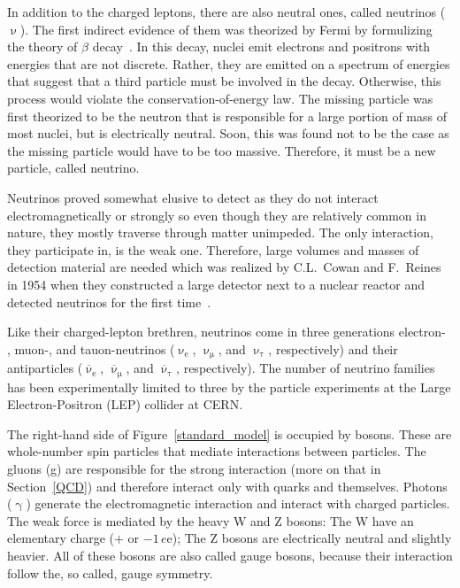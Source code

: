In addition to the charged leptons, there are also neutral ones, called neutrinos ($\upnu$)\@. The first indirect evidence of them was theorized by Fermi by formulizing the theory of $\beta$ decay~\cite{Fermi}\@. In this decay, nuclei emit electrons and positrons with energies that are not discrete. Rather, they are emitted on a spectrum of energies that suggest that a third particle must be involved in the decay. Otherwise, this process would violate the conservation-of-energy law. The missing particle was first theorized to be the neutron that is responsible for a large portion of mass of most nuclei, but is electrically neutral. Soon, this was found not to be the case as the missing particle would have to be too massive. Therefore, it must be a new particle, called neutrino.

Neutrinos proved somewhat elusive to detect as they do not interact electromagnetically or strongly so even though they are relatively common in nature, they mostly traverse through matter unimpeded. The only interaction, they participate in, is the weak one. Therefore, large volumes and masses of detection material are needed which was realized by C.L.\ Cowan and F.\ Reines in 1954 when they constructed a large detector next to a nuclear reactor and detected neutrinos for the first time~\cite{CowanNeutrinos}\@.

Like their charged-lepton brethren, neutrinos come in three generations electron- , muon-, and tauon-neutrinos ($\upnu_\mathrm{e}$, $\upnu_\upmu$, and $\upnu_\uptau$, respectively) and their antiparticles ($\overline{\upnu}_\mathrm{e}$, $\overline{\upnu}_\upmu$, and $\overline{\upnu}_\uptau$, respectively). The number of neutrino families has been experimentally limited to three by the particle experiments at the Large Electron-Positron (LEP) collider at CERN\@.

The right-hand side of Figure~\ref{standard_model} is occupied by bosons. These are whole-number spin particles that mediate interactions between particles. The gluons (g) are responsible for the strong interaction (more on that in Section~\ref{QCD}) and therefore interact only with quarks and themselves. Photons ($\upgamma$) generate the electromagnetic interaction and interact with charged particles. The weak force is mediated by the heavy W and Z bosons: The W have an elementary charge ($+$ or $-1\,e$e); The Z bosons are electrically neutral and slightly heavier. All of these bosons are also called gauge bosons, because their interaction follow the, so called, gauge symmetry.

